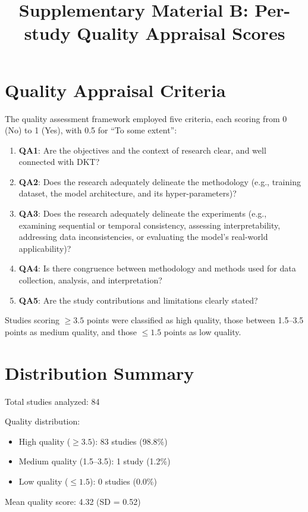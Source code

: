 \documentclass{article}
\begin{document}
\title{Supplementary Material B: Per-study Quality Appraisal Scores}

\section*{Quality Appraisal Criteria}

The quality assessment framework employed five criteria, each scoring from 0 (No) to 1 (Yes), with 0.5 for ``To some extent'':

\begin{enumerate}
\item \textbf{QA1}: Are the objectives and the context of research clear, and well connected with DKT?
\item \textbf{QA2}: Does the research adequately delineate the methodology (e.g., training dataset, the model architecture, and its hyper-parameters)?
\item \textbf{QA3}: Does the research adequately delineate the experiments (e.g., examining sequential or temporal consistency, assessing interpretability, addressing data inconsistencies, or evaluating the model's real-world applicability)?
\item \textbf{QA4}: Is there congruence between methodology and methods used for data collection, analysis, and interpretation?
\item \textbf{QA5}: Are the study contributions and limitations clearly stated?
\end{enumerate}

Studies scoring $\geq 3.5$ points were classified as high quality, those between 1.5--3.5 points as medium quality, and those $\leq 1.5$ points as low quality.

\section*{Distribution Summary}

Total studies analyzed: 84

Quality distribution:
\begin{itemize}
\item High quality ($\geq 3.5$): 83 studies (98.8\%)
\item Medium quality (1.5--3.5): 1 study (1.2\%)  
\item Low quality ($\leq 1.5$): 0 studies (0.0\%)
\end{itemize}

Mean quality score: 4.32 (SD = 0.52)
\end{document}
